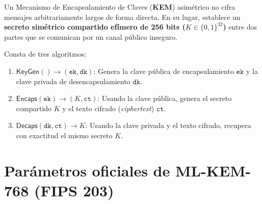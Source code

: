 \documentclass[11pt,a4paper,twoside,openright]{book}
\theoremstyle{plain}
\theoremstyle{definition}
\theoremstyle{remark}
\newcommand{\KeyGen}{\mathsf{KeyGen}}
\newcommand{\Encaps}{\mathsf{Encaps}}
\newcommand{\Decaps}{\mathsf{Decaps}}
\begin{document}
Un Mecanismo de Encapsulamiento de Claves (\textbf{KEM}) asim\'etrico no cifra mensajes arbitrariamente largos de forma directa. En su lugar, establece un \textbf{secreto sim\'etrico compartido ef\'imero de 256 bits ($K \in \{0, 1\}^{32}$)} entre dos partes que se comunican por un canal p\'ublico inseguro.

Consta de tres algoritmos:
\begin{enumerate}
  \item $\KeyGen() \to (\mathtt{ek}, \mathtt{dk})$: Genera la clave p\'ublica de encapsulamiento $\mathtt{ek}$ y la clave privada de desencapsulamiento $\mathtt{dk}$.
  \item $\Encaps(\mathtt{ek}) \to (K, \mathtt{ct})$: Usando la clave p\'ublica, genera el secreto compartido $K$ y el texto cifrado (\emph{ciphertext}) $\mathtt{ct}$.
  \item $\Decaps(\mathtt{dk}, \mathtt{ct}) \to K$: Usando la clave privada y el texto cifrado, recupera con exactitud el mismo secreto $K$.
\end{enumerate}

\section{Par\'ametros oficiales de ML-KEM-768 (FIPS 203)}
\end{document}
